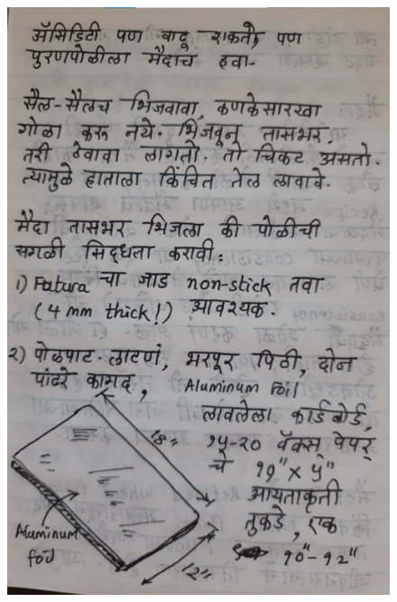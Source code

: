 \documentclass[17pt]{extarticle}  %
\begin{document}
\begin{figure}[h!]
    \centering
    \includegraphics{img/08-s.png}
\end{figure}
\end{document}
